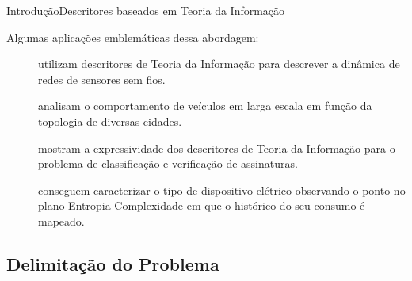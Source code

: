 \documentclass[10pt,xcolor={dvipsnames}]{beamer}
\begin{document}
\begin{frame}{Introdução}{Descritores baseados em Teoria da Informação}
\begin{block}{Algumas aplicações emblemáticas dessa abordagem:}
	\begin{description}
		\item[\cite{StructuralChangesDataCommunicationWSN}] utilizam descritores de Teoria da Informação para descrever a dinâmica de redes de sensores sem fios.
		\item[\cite{CharacterizationVehicleBehaviorInformationTheory}] analisam o comportamento de veículos em larga escala em função da topologia de diversas cidades.
		\item[\cite{ClassificationVerificationOnlineHandwrittenSignatures}] mostram a expressividade dos descritores de Teoria da Informação para o problema de classificação e verificação de assinaturas.
		\item[\cite{CharacterizationElectricLoadInformationTheoryQuantifiers}] conseguem caracterizar o tipo de dispositivo elétrico observando o ponto no plano Entropia-Complexidade em que o histórico do seu consumo é mapeado.
	\end{description}
\end{block}
\end{frame}

\subsection{Delimitação do Problema}
\end{document}
